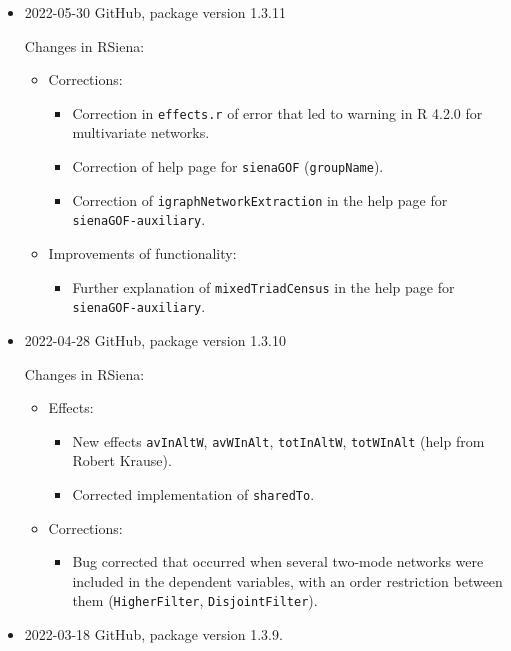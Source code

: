 \documentclass[a4paper,fleqn,11pt]{article}
\newcommand{\+}{\, + \,}
\begin{document}
\begin{small}
\begin{itemize}
\item 2022-05-30 GitHub, package version 1.3.11

Changes in RSiena:

\begin{itemize}
\item  Corrections:
\begin{itemize}
\item  Correction in  \texttt{effects.r} of error that led to warning
    in R 4.2.0 for multivariate networks.
\item  Correction of help page for  \texttt{sienaGOF} (\texttt{groupName}).
 \item  Correction of  \texttt{igraphNetworkExtraction} in the help page for
     \texttt{sienaGOF-auxiliary}.
\end{itemize}
\item  Improvements of functionality:
\begin{itemize}
\item  Further explanation of  \texttt{mixedTriadCensus} in the help page for
     \texttt{sienaGOF-auxiliary}.
\end{itemize}
\end{itemize}




\item 2022-04-28 GitHub, package version 1.3.10

Changes in RSiena:
\begin{itemize}
\item  Effects:
\begin{itemize}
  \item New effects  \texttt{avInAltW}, \texttt{avWInAlt}, \texttt{totInAltW}, \texttt{totWInAlt} (help from Robert Krause).
  \item Corrected implementation of \texttt{sharedTo}.
\end{itemize}
\item Corrections:
\begin{itemize}
  \item Bug corrected that occurred when several two-mode networks were included in the dependent variables, with an order restriction between them (\texttt{HigherFilter}, \texttt{DisjointFilter}).
\end{itemize}

\end{itemize}

\item 2022-03-18 GitHub, package version 1.3.9.


\end{itemize}
\end{small}
\end{document}

